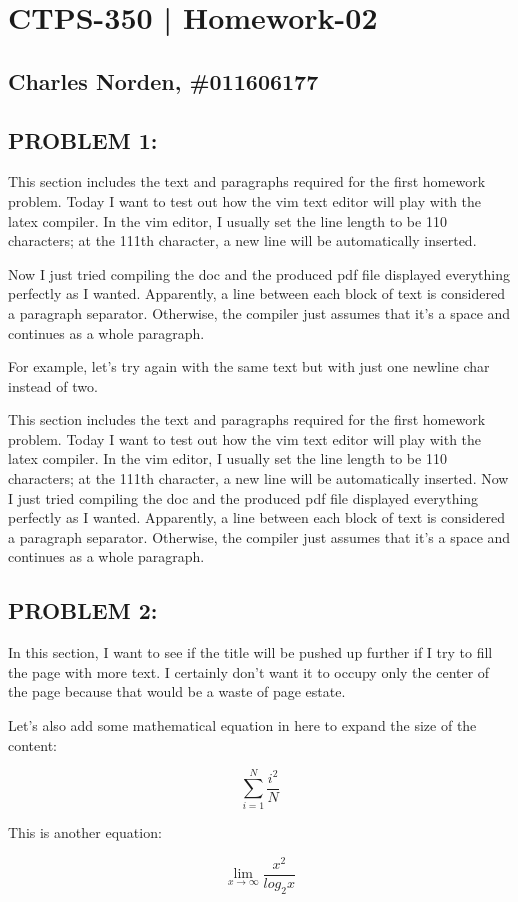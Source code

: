 \documentclass[12pt,letterpaper]{article}
\begin{document}
\section*{CTPS-350 | Homework-02 }
\subsection*{Charles Norden, \#011606177 }

\subsection*{PROBLEM 1:}
This section includes the text and paragraphs required for the first homework problem. Today I want to test
out how the vim text editor will play with the latex compiler. In the vim editor, I usually set the line 
length to be 110 characters; at the 111th character, a new line will be automatically inserted.

Now I just tried compiling the doc and the produced pdf file displayed everything perfectly as I wanted.
Apparently, a line between each block of text is considered a paragraph separator. Otherwise, the compiler
just assumes that it's a space and continues as a whole paragraph.

For example, let's try again with the same text but with just one newline char instead of two.

This section includes the text and paragraphs required for the first homework problem. Today I want to test
out how the vim text editor will play with the latex compiler. In the vim editor, I usually set the line 
length to be 110 characters; at the 111th character, a new line will be automatically inserted.
Now I just tried compiling the doc and the produced pdf file displayed everything perfectly as I wanted.
Apparently, a line between each block of text is considered a paragraph separator. Otherwise, the compiler
just assumes that it's a space and continues as a whole paragraph.
\pagebreak

\subsection*{PROBLEM 2:}
In this section, I want to see if the title will be pushed up further if I try to fill the page with more
text. I certainly don't want it to occupy only the center of the page because that would be a waste of page
estate.

Let's also add some mathematical equation in here to expand the size of the content:

\[ \sum_{i=1}^{N} \frac {i^2} {N} \]

This is another equation:

\[ \lim_{x \to \infty } \frac{x^2}{log_2 x} \]
\end{document}
